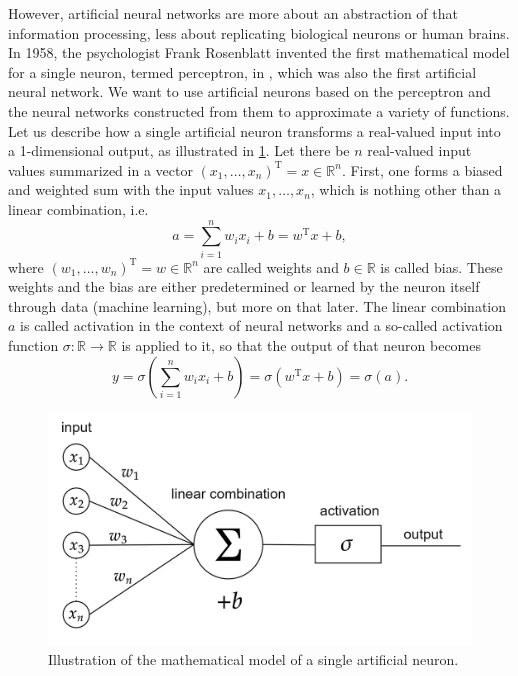 However, artificial neural networks are more about an abstraction of that information processing, less about replicating biological neurons or human brains. In 1958, the psychologist Frank Rosenblatt invented the first mathematical model for a single neuron, termed perceptron, in \cite{Rosenblatt:1958}, which was also the first artificial neural network. We want to use artificial neurons based on the perceptron and the neural networks constructed from them to approximate a variety of functions. \\
Let us describe how a single artificial neuron transforms a real-valued input into a 1-dimensional output, as illustrated in \cref{fig4}. Let there be $n$ real-valued input values summarized in a vector $(x_1, \ldots, x_n)^{\mathrm{T}} = x \in \mathbb{R}^n$. First, one forms a biased and weighted sum with the input values $x_1, \ldots, x_n$, which is nothing other than a linear combination, i.e. 
\begin{equation*}
    a = \sum^{n}_{i=1} w_i x_i + b = w^{\mathrm{T}} x + b,
\end{equation*}
where $(w_1, \ldots, w_n)^{\mathrm{T}} = w \in \mathbb{R}^n$ are called weights and $b \in \mathbb{R}$ is called bias. These weights and the bias are either predetermined or learned by the neuron itself through data (machine learning), but more on that later. The linear combination $a$ is called activation in the context of neural networks and a so-called activation function $\sigma \colon \mathbb{R} \to \mathbb{R}$ is applied to it, so that the output of that neuron becomes
\begin{equation*}
    y = \sigma \left( \sum^{n}_{i=1} w_i x_i + b \right) = \sigma \left( w^{\mathrm{T}} x + b \right) = \sigma(a).
\end{equation*}

\begin{figure}[H]
    \begin{center}
        \includegraphics[scale=0.25]{img/diagram-20220205_1.png}
    \end{center}
    \caption{Illustration of the mathematical model of a single artificial neuron.}
    \label{fig4}
\end{figure}

